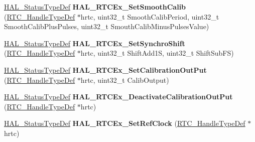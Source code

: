 \begin{DoxyCompactItemize}
\item 
\hyperlink{stm32f4xx__hal__def_8h_a63c0679d1cb8b8c684fbb0632743478f}{H\+A\+L\+\_\+\+Status\+Type\+Def} {\bfseries H\+A\+L\+\_\+\+R\+T\+C\+Ex\+\_\+\+Set\+Smooth\+Calib} (\hyperlink{struct_r_t_c___handle_type_def}{R\+T\+C\+\_\+\+Handle\+Type\+Def} $\ast$hrtc, uint32\+\_\+t Smooth\+Calib\+Period, uint32\+\_\+t Smooth\+Calib\+Plus\+Pulses, uint32\+\_\+t Smouth\+Calib\+Minus\+Pulses\+Value)\hypertarget{group___r_t_c_ex___exported___functions___group3_ga394b6624dbda05ef3e375d83884ba00b}{}\label{group___r_t_c_ex___exported___functions___group3_ga394b6624dbda05ef3e375d83884ba00b}

\item 
\hyperlink{stm32f4xx__hal__def_8h_a63c0679d1cb8b8c684fbb0632743478f}{H\+A\+L\+\_\+\+Status\+Type\+Def} {\bfseries H\+A\+L\+\_\+\+R\+T\+C\+Ex\+\_\+\+Set\+Synchro\+Shift} (\hyperlink{struct_r_t_c___handle_type_def}{R\+T\+C\+\_\+\+Handle\+Type\+Def} $\ast$hrtc, uint32\+\_\+t Shift\+Add1S, uint32\+\_\+t Shift\+Sub\+FS)\hypertarget{group___r_t_c_ex___exported___functions___group3_ga07344e3d0f7e9f569ec02d4a75d158dc}{}\label{group___r_t_c_ex___exported___functions___group3_ga07344e3d0f7e9f569ec02d4a75d158dc}

\item 
\hyperlink{stm32f4xx__hal__def_8h_a63c0679d1cb8b8c684fbb0632743478f}{H\+A\+L\+\_\+\+Status\+Type\+Def} {\bfseries H\+A\+L\+\_\+\+R\+T\+C\+Ex\+\_\+\+Set\+Calibration\+Out\+Put} (\hyperlink{struct_r_t_c___handle_type_def}{R\+T\+C\+\_\+\+Handle\+Type\+Def} $\ast$hrtc, uint32\+\_\+t Calib\+Output)\hypertarget{group___r_t_c_ex___exported___functions___group3_gafee5f33f43d10ae0b64aa073412de17e}{}\label{group___r_t_c_ex___exported___functions___group3_gafee5f33f43d10ae0b64aa073412de17e}

\item 
\hyperlink{stm32f4xx__hal__def_8h_a63c0679d1cb8b8c684fbb0632743478f}{H\+A\+L\+\_\+\+Status\+Type\+Def} {\bfseries H\+A\+L\+\_\+\+R\+T\+C\+Ex\+\_\+\+Deactivate\+Calibration\+Out\+Put} (\hyperlink{struct_r_t_c___handle_type_def}{R\+T\+C\+\_\+\+Handle\+Type\+Def} $\ast$hrtc)\hypertarget{group___r_t_c_ex___exported___functions___group3_ga4cba173360f2993cafdd2c77fc51b7a9}{}\label{group___r_t_c_ex___exported___functions___group3_ga4cba173360f2993cafdd2c77fc51b7a9}

\item 
\hyperlink{stm32f4xx__hal__def_8h_a63c0679d1cb8b8c684fbb0632743478f}{H\+A\+L\+\_\+\+Status\+Type\+Def} {\bfseries H\+A\+L\+\_\+\+R\+T\+C\+Ex\+\_\+\+Set\+Ref\+Clock} (\hyperlink{struct_r_t_c___handle_type_def}{R\+T\+C\+\_\+\+Handle\+Type\+Def} $\ast$hrtc)\hypertarget{group___r_t_c_ex___exported___functions___group3_gad3759b90bbf48597b2797411c72632dc}{}\label{group___r_t_c_ex___exported___functions___group3_gad3759b90bbf48597b2797411c72632dc}


\end{DoxyCompactItemize}

